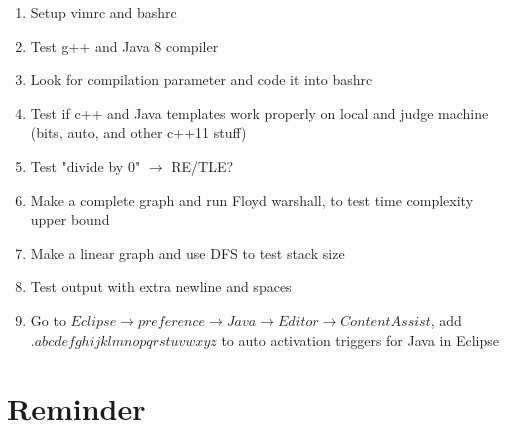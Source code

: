 \documentclass[10pt,oneside]{article}
\begin{document}
\begin{landscape}
\begin{multicols}{2}
{\normalsize
\begin{enumerate}
	\item Setup vimrc and bashrc
	\item Test g++ and Java 8 compiler
	\item Look for compilation parameter and code it into bashrc
	\item Test if c++ and Java templates work properly on local and judge machine (bits, auto, and other c++11 stuff)
	\item Test "divide by 0" $\rightarrow$ RE/TLE?
	\item Make a complete graph and run Floyd warshall, to test time complexity upper bound
	\item Make a linear graph and use DFS to test stack size
	\item Test output with extra newline and spaces
	\item Go to $Eclipse \rightarrow preference \rightarrow Java \rightarrow Editor \rightarrow Content Assist$, add $.abcdefghijklmnopqrstuvwxyz$ to auto activation triggers for Java in Eclipse
\end{enumerate}
}


\section{Reminder}



\end{multicols}
\end{landscape}
\end{document}
